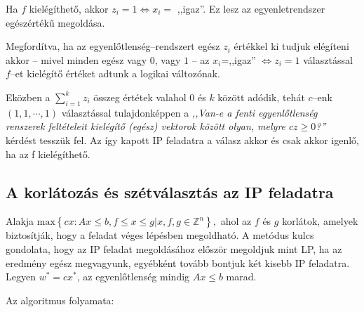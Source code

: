 Ha $f$ kielégíthető, akkor $z_i=1 \Leftrightarrow x_i=$ ,,igaz''. Ez lesz az
egyenletrendszer egészértékű megoldása. 

Megfordítva, ha az egyenlőtlenség--rendszert egész $z_i$ értékkel ki tudjuk
elégíteni akkor -- mivel minden egész vagy $0$, vagy $1$ -- az $x_i$=,,igaz''
$\Leftrightarrow z_i=1$ választással $f$--et kielégítő értéket adtunk a logikai
változónak.

Eközben a $\sum_{i=1}^{k}{z_i}$ összeg értétek valahol $0$ és $k$ között adódik,
tehát $c$--enk $(1,1,\cdots,1)$ választással tulajdonképpen a \emph{,,Van-e a fenti
egyenlőtlenség renszerek feltételeit kielégítő (egész) vektorok között olyan,
melyre $cz \geq 0$?''} kérdést tesszük fel. Az így kapott IP feladatra a válasz
akkor és csak akkor igenlő, ha az f kielégíthető.

\subsection{A korlátozás és szétválasztás az IP feladatra}

Alakja $\mbox{max} \left\{cx:Ax \leq b, f \leq x \leq g| x,f,g \in \mathbb{Z}^n
\right\},$ ahol az $f$ és $g$ korlátok, amelyek biztosítják, hogy a feladat véges
lépésben megoldható. A metódus kulcs gondolata, hogy az IP feladat megoldásához először
megoldjuk mint LP, ha az eredmény egész megvagyunk, egyébként tovább bontjuk két kisebb
IP feladatra. Legyen $w^*=cx^*$, az egyenlőtlenség mindig $Ax \leq b$ marad.

Az algoritmus folyamata:

